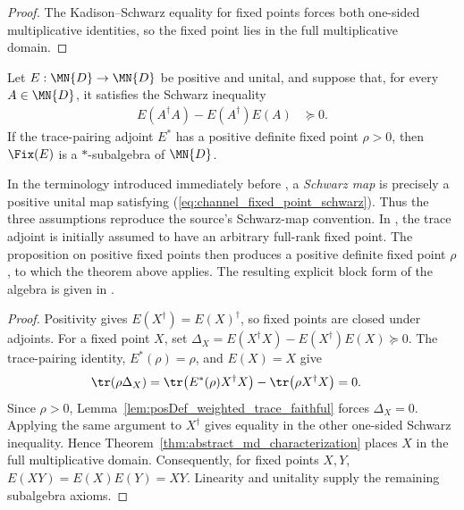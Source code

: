 \begin{proof}\leanok
    The Kadison--Schwarz equality for fixed points forces both one-sided
    multiplicative identities, so the fixed point lies in the full
    multiplicative domain.
\end{proof}

\begin{theorem}
    \label{thm:fixedPointsStarSubalgebra}
    \leanok
    Let $E:\MN{D}\to\MN{D}$ be positive and unital, and suppose that, for
    every $A\in\MN{D}$, it satisfies the Schwarz inequality
    \begin{align}
        E(A^\dagger A)-E(A^\dagger)E(A)
         & \succeq0.
        \label{eq:channel_fixed_point_schwarz}
    \end{align}
    If the trace-pairing adjoint $E^*$ has a positive definite fixed point
    $\rho>0$, then $\Fix(E)$ is a $*$-subalgebra of $\MN{D}$.

    In the terminology introduced immediately before
    \cite[Example~5.3]{Wolf2012Quantum}, a \emph{Schwarz map} is precisely a
    positive unital map satisfying (\ref{eq:channel_fixed_point_schwarz}).
    Thus the three assumptions reproduce the source's Schwarz-map convention.
    In \cite[Theorem~6.12]{Wolf2012Quantum}, the trace adjoint is initially
    assumed to have an arbitrary full-rank fixed point. The proposition on
    positive fixed points then produces a positive definite fixed point
    $\rho$, to which the theorem above applies. The resulting explicit block
    form of the algebra is given in
    \cite[Equation~(1.39)]{Wolf2012Quantum}.
\end{theorem}

\begin{proof}\leanok
    Positivity gives $E(X^\dagger)=E(X)^\dagger$, so fixed points are closed
    under adjoints. For a fixed point $X$, set
    $\Delta_X=E(X^\dagger X)-E(X^\dagger)E(X)\succeq0$.
    The trace-pairing identity, $E^*(\rho)=\rho$, and $E(X)=X$ give
    \begin{align}
        \tr(\rho\Delta_X)
         & =\tr\!\left(E^*(\rho)X^\dagger X\right)
        -\tr\!\left(\rho X^\dagger X\right)
        =0.
        \notag
    \end{align}
    Since $\rho>0$, Lemma~\ref{lem:posDef_weighted_trace_faithful}
    forces $\Delta_X=0$. Applying the same argument to $X^\dagger$ gives
    equality in the other one-sided Schwarz inequality. Hence
    Theorem~\ref{thm:abstract_md_characterization} places $X$ in the full
    multiplicative domain. Consequently, for fixed points $X,Y$,
    $E(XY)=E(X)E(Y)=XY$. Linearity and unitality supply the remaining
    subalgebra axioms.
\end{proof}

